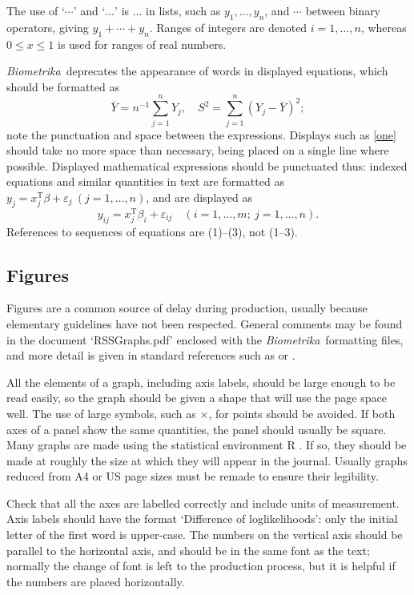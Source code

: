 \documentclass[article,lineno]{biometrika}
\def\Bka{{\it Biometrika}}
\def\T{{ \mathrm{\scriptscriptstyle T} }}
\def\v{{\varepsilon}}
\begin{document}
The use of `$\cdots$' and `$\ldots$' is  $\ldots$ in lists, such as $y_1,\ldots,y_n$, and $\cdots$ between binary operators,  giving $y_1+\cdots+y_n$.
Ranges of integers are denoted $i=1,\ldots, n$, whereas $0\leq x\leq 1$ is used for ranges of real numbers.  %

\Bka\ deprecates the appearance of words in displayed equations, which should be formatted as
\begin{equation}
\label{one}
\bar Y = n^{-1} \sum_{j=1}^n Y_j,\quad S^2 = \sum_{j=1}^n (Y_j-\bar Y)^2;
\end{equation}
note the punctuation and space between the expressions. Displays such as \eqref{one} should take no more space than necessary, being placed on a single line where possible.  Displayed mathematical expressions should be punctuated thus: indexed equations and similar quantities in text are formatted as
$y_j = x_j^\T\beta + \v_j\ (j=1,\ldots, n)$, and are displayed as
\[
y_{ij} = x_j^\T\beta_i + \v_{ij}\quad (i=1,\ldots, m;\ j=1,\ldots, n).
\]
References to sequences of equations are (1)--(3), not (1--3).

\subsection{Figures}

Figures are a common source of delay during production, usually because elementary guidelines have not been respected.  General comments may be found in the document `RSSGraphs.pdf' enclosed with the \Bka\ formatting files, and more detail is given in standard references such as \citet{Cleveland:1993,Cleveland:1994} or \citet{Tufte:1983}.

All the elements of a graph, including axis labels, should be large enough to be read easily, so the graph should be given a shape that will use the page space well. The use of large symbols, such as $\times$, for points should be avoided. If both axes of a panel show the same quantities, the panel should usually be square.  Many graphs are made using the statistical environment R \citep{R:2010}.  If so, they should be made at roughly the size at which they will appear in the journal.  Usually graphs reduced from A4 or US page sizes must be remade to ensure their legibility.

Check that all the axes are labelled correctly and include units of measurement.  Axis labels should have the format `Difference of loglikelihoods': only the initial letter of the first word is upper-case.
The numbers on the vertical axis should be parallel to the horizontal axis, and should be in the same font as the text; normally the change of font is left to the production process, but it is helpful if the numbers are placed horizontally.
\end{document}

